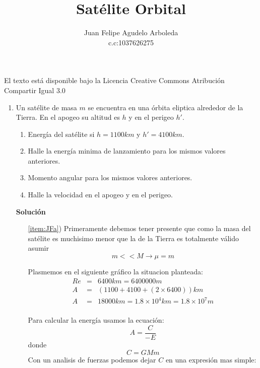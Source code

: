 \documentclass[12pt]{article}
\title{Satélite Orbital}
\author{Juan Felipe Agudelo Arboleda \\c.c:1037626275}
\begin{document}
\maketitle


El texto está disponible bajo la Licencia Creative Commons Atribución Compartir Igual 3.0
\begin{enumerate} 

\item Un satélite de masa $m$ se encuentra en una órbita eliptica alrededor de la Tierra. En el apogeo su altitud es $h$ y en el perigeo $h'$. 

 
  \begin{minipage}{0.6\linewidth}
    \begin{enumerate}
    \item Energía del satélite si $h=1100 km$ y $h'=4100 km$.
      \label{item:JFa}
    \item Halle la energía minima de lanzamiento para los mismos valores anteriores.
      \label{item:JFb}
      \item Momento angular para los mismos valores anteriores.
      \label{item:JFc}    
     \item Halle la velocidad en el apogeo y en el perigeo.
      \label{item:JFd}
    \end{enumerate}
  \end{minipage}
  
  \textbf{Solución}
  \begin{itemize}  
  
  \item[\ref{item:JFa})]
  Primeramente debemos tener presente que como la masa del satélite es muchisimo menor que la de la Tierra es totalmente válido asumir
\begin{equation} 
m<<M\rightarrow\mu=m\nonumber
\end{equation}

Plasmemos en el siguiente gráfico la situacion planteada:\\

  \begin{eqnarray}
  Re&=&6400 km=6400000 m\nonumber\\ 
  A&=&(1100+4100+(2\times6400)) km\nonumber\\
  A&=&18000  km = 1.8\times10^4 km = 1.8\times10^7 m\\
   \nonumber
 \end{eqnarray}
 
 Para calcular la energía usamos la ecuación:
\begin{equation}
A=\frac{C}{-E}\nonumber
\end{equation}
donde
\begin{equation}
C=G M m\nonumber
\end{equation} 
Con un analisis de fuerzas podemos dejar $C$ en una expresión mas simple:\\
\begin{center}



\end{center}
\end{itemize}
\end{enumerate}
\end{document}
